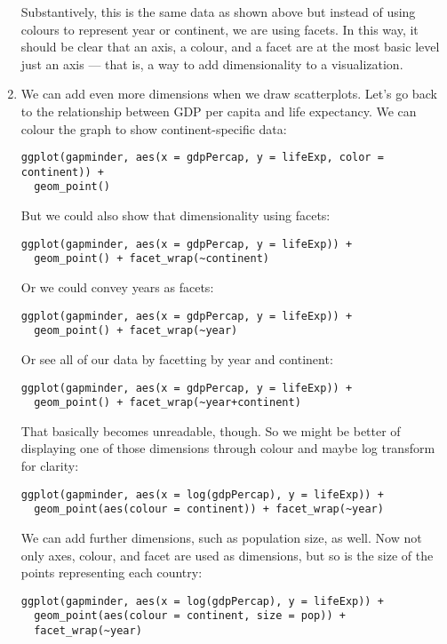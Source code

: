 \documentclass[a4paper,12pt]{article}
\begin{document}
\begin{enumerate}
Substantively, this is the same data as shown above but instead of using colours to represent year or continent, we are using facets. In this way, it should be clear that an axis, a colour, and a facet are at the most basic level just an axis --- that is, a way to add dimensionality to a visualization.

\item We can add even more dimensions when we draw scatterplots. Let's go back to the relationship between GDP per capita and life expectancy. We can colour the graph to show continent-specific data:

\begin{verbatim}
ggplot(gapminder, aes(x = gdpPercap, y = lifeExp, color = continent)) + 
  geom_point()
\end{verbatim}

But we could also show that dimensionality using facets:

\begin{verbatim}
ggplot(gapminder, aes(x = gdpPercap, y = lifeExp)) + 
  geom_point() + facet_wrap(~continent)
\end{verbatim}

Or we could convey years as facets:

\begin{verbatim}
ggplot(gapminder, aes(x = gdpPercap, y = lifeExp)) + 
  geom_point() + facet_wrap(~year)
\end{verbatim}

Or see all of our data by facetting by year and continent:

\begin{verbatim}
ggplot(gapminder, aes(x = gdpPercap, y = lifeExp)) + 
  geom_point() + facet_wrap(~year+continent)
\end{verbatim}

That basically becomes unreadable, though. So we might be better of displaying one of those dimensions through colour and maybe log transform for clarity:

\begin{verbatim}
ggplot(gapminder, aes(x = log(gdpPercap), y = lifeExp)) + 
  geom_point(aes(colour = continent)) + facet_wrap(~year)
\end{verbatim}

We can add further dimensions, such as population size, as well. Now not only axes, colour, and facet are used as dimensions, but so is the size of the points representing each country:

\begin{verbatim}
ggplot(gapminder, aes(x = log(gdpPercap), y = lifeExp)) + 
  geom_point(aes(colour = continent, size = pop)) + 
  facet_wrap(~year)
\end{verbatim}


\end{enumerate}
\end{document}
